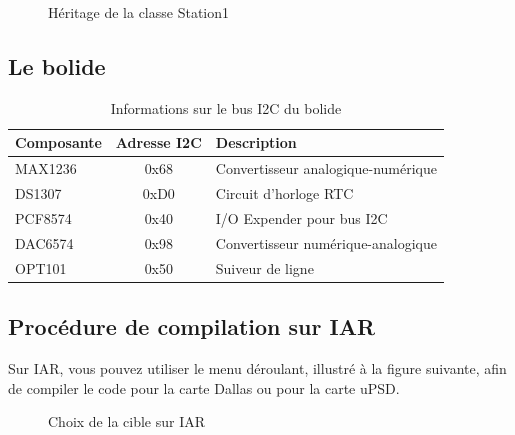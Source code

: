 \documentclass[10pt,a4paper,final]{article}
\begin{document}
\begin{spacing}{1.5}
\begin{figure}[hbtp]
\caption{Héritage de la classe Station1}
\centering
{}
\end{figure}


\subsection{Le bolide}
\begin{table}[!ht]
\centering
\begin{tabular}{|l|c|l|}
\hline 
\textbf{Composante} & \textbf{Adresse I{\small 2}C} & \textbf{Description} \\ 
\hline 
MAX1236 & 0x68 & Convertisseur analogique-numérique \\ 
\hline 
DS1307  & 0xD0 & Circuit d'horloge RTC \\ 
\hline 
PCF8574 & 0x40 & I/O Expender pour bus I{\small 2}C \\ 
\hline 
DAC6574 & 0x98  & Convertisseur numérique-analogique  \\ 
\hline 
OPT101  &  0x50 & Suiveur de ligne  \\ 
\hline 
\end{tabular} 
\caption{Informations sur le bus I{\small 2}C du bolide}
\label{tab:testtab1}
\end{table}

\pagebreak
\subsection{Procédure de compilation sur IAR}
Sur IAR, vous pouvez utiliser le menu déroulant, illustré à la figure suivante, afin de compiler le code pour la carte Dallas ou pour la carte uPSD. 

\begin{figure}[hbtp]
\caption{Choix de la cible sur IAR}
\centering
{}
\end{figure}


\end{spacing}
\end{document}
